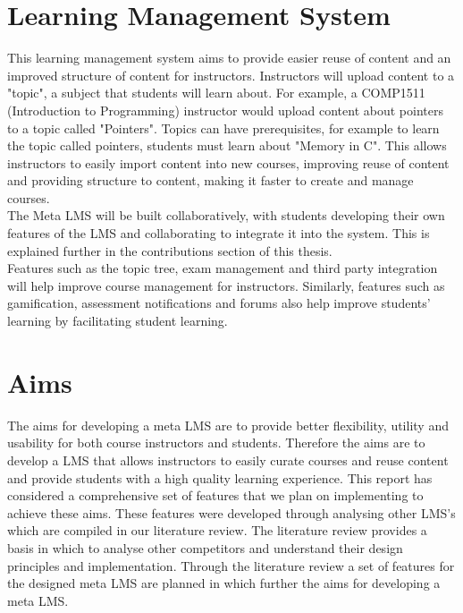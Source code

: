\section{Learning Management System}
This learning management system aims to provide easier reuse of content and an improved structure of content for instructors. Instructors will upload content to a "topic", a subject that students will learn about. For example, a COMP1511 (Introduction to Programming) instructor would upload content about pointers to a topic called "Pointers". Topics can have prerequisites, for example to learn the topic called pointers, students must learn about "Memory in C". This allows instructors to easily import content into new courses, improving reuse of content and providing structure to content, making it faster to create and manage courses.\\
The Meta LMS will be built collaboratively, with students developing their own features of the LMS and collaborating to integrate it into the system. This is explained further in the contributions section of this thesis. \\
Features such as the topic tree, exam management and third party integration will help improve course management for instructors. Similarly, features such as gamification, assessment notifications and forums also help improve students' learning by facilitating student learning.\\

\section{Aims}
The aims for developing a meta LMS are to provide better flexibility, utility and usability for both course instructors and students. 
Therefore the aims are to develop a LMS that allows instructors to easily curate courses and reuse content and provide students with a high quality learning experience. 
This report has considered a comprehensive set of features that we plan on implementing to achieve these aims. 
These features were developed through analysing other LMS’s which are compiled in our literature review.
The literature review provides a basis in which to analyse other competitors and understand their design principles and implementation.
Through the literature review a set of features for the designed meta LMS are planned in which further the aims for developing a meta LMS.
